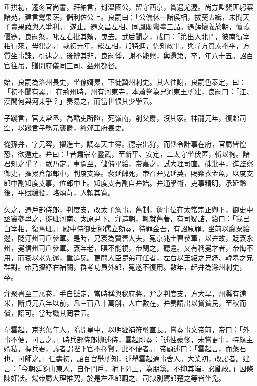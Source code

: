 \begin{pinyinscope}
 垂拱初，遷冬官尚書，拜納言，封溫國公，留守西京，賞遇尤渥。尚方監裴匪躬案諸苑，建言鬻果蔬，儲利佐公上。良嗣曰：「公儀休一諸侯相，拔葵去織，未聞天子賣果蔬與人爭利。」遂止。遷文昌左相、同鳳閣鸞臺三品。遇薛懷義於朝，懷義偃蹇，良嗣怒，叱左右批其頰，曳去。武后聞之，戒曰：「第出入北門，彼南衙宰相行來，毋犯之。」載初元年，罷左相，加特進，仍知政事。與韋方質素不平，方質坐事誅，引逮之。後辨其非，良嗣悸，謝不能興，輿還第，卒，年八十五。詔百官往吊，贈開府儀同三司、益州都督。



 始，良嗣為洛州長史，坐僚婿累，下徙冀州刺史。其人往謝，良嗣色泰定，曰：「初不聞有累。」在荊州時，州有河東寺，本蕭詧為兄河東王所建，良嗣曰：「江、漢間何與河東乎？」奏易之，而當世恨其少學云。



 子踐言，官太常丞，為酷吏所陷，死嶺南，削父爵，沒其家。神龍元年，復贈司空，以踐言子務元襲爵，終邠王府長史。



 從孫弁，字元容，擢進士，調奉天主簿。德宗出狩，而縣令計事在府，官屬皆惶恐，欲遁走。弁曰：「昔肅宗幸靈武，至新平、安定，二太守坐伏匿，斬以徇。諸君知之乎？」眾乃定。車駕至，儲偫畢給，帝嘉之，試大理司直。硃泚平，進監察御史，擢累倉部郎中，判度支案。裴延齡死，帝召弁見延英，賜紫衣金魚，以度支郎中副知度支事，位郎中上。知度支有副自弁始。弁通學術，吏事精明，承延齡後，平賦緩役，略煩苛，人賴其寬。



 久之，遷戶部侍郎，判度支，改太子詹事。舊制，詹事位在太常宗正卿下，御史中丞竇參卑之，徙班河南、太原尹下。弁造朝，輒就舊著，有司疑詰，紿曰：「我已白宰相，復舊班。」殿中侍御史鄒儒立劾奏，待罪金吾，有詔原罪。坐前以腐粟給邊，貶汀州司戶參軍。是時，兄袞為贊善大夫，冕京兆士曹參軍，以弁故，貶袞永州，冕信州司戶參軍。袞年老，瞑不能視，帝閔之，聽還。又有稱冕才者，帝悔不用，而袞以老先還，重追冕。更問大臣昆弟可任者，左右以王紹之兄紓、韓皋之兄群對。帝乃擢紓右補闕，群考功員外郎，冕遂不復用。數年，起弁為滁州刺史，卒。



 弁聚書至二萬卷，手自讎定，當時稱與秘府將。弁之判度支，方大旱，州縣有逋米，斷貞元八年以前，凡三百八十萬斛，人亡數在，弁奏請出以貸貧民，至秋而償，詔可。當時譏其罔君云。



 韋雲起，京兆萬年人。隋開皇中，以明經補符璽直長。嘗奏事文帝前，帝曰：「外事不便，可言之。」時兵部侍郎柳述侍，雲起即奏：「述性豪侈，未嘗更事，特緣主婿私，握兵要，議者謂陛下官不擇賢，此不便者。」帝顧述曰：「雲起言，而藥石也，可師之。」仁壽初，詔百官舉所知，述舉雲起通事舍人。大業初，改謁者。建言：「今朝廷多山東人，自作門戶，附下罔上，為朋黨。不抑其端，必亂政。」因條陳奸狀。煬帝屬大理推究，於是左丞郎蔚之、司隸別駕郎楚之等皆坐免。




\end{pinyinscope}
